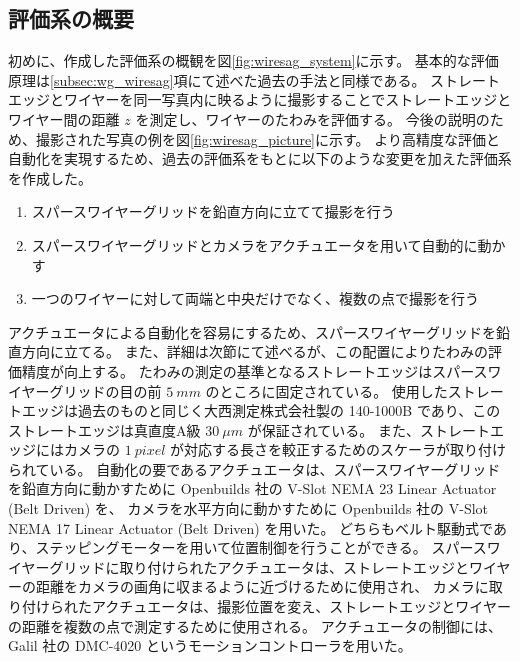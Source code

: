 \documentclass[../../main.tex]{subfiles}
\begin{document}
\subsection{評価系の概要}
初めに、作成した評価系の概観を図\ref{fig:wiresag_system}に示す。
基本的な評価原理は\ref{subsec:wg_wiresag}項にて述べた過去の手法と同様である。
ストレートエッジとワイヤーを同一写真内に映るように撮影することでストレートエッジとワイヤー間の距離 $z$ を測定し、ワイヤーのたわみを評価する。
今後の説明のため、撮影された写真の例を図\ref{fig:wiresag_picture}に示す。
より高精度な評価と自動化を実現するため、過去の評価系をもとに以下のような変更を加えた評価系を作成した。
\begin{enumerate}
    \item スパースワイヤーグリッドを鉛直方向に立てて撮影を行う
    \item スパースワイヤーグリッドとカメラをアクチュエータを用いて自動的に動かす
    \item 一つのワイヤーに対して両端と中央だけでなく、複数の点で撮影を行う
\end{enumerate}

アクチュエータによる自動化を容易にするため、スパースワイヤーグリッドを鉛直方向に立てる。
また、詳細は次節にて述べるが、この配置によりたわみの評価精度が向上する。
たわみの測定の基準となるストレートエッジはスパースワイヤーグリッドの目の前 $\SI{5}{mm}$ のところに固定されている。
使用したストレートエッジは過去のものと同じく大西測定株式会社製の 140-1000B であり、このストレートエッジは真直度A級 $\SI{30}{\mu m}$ が保証されている。
また、ストレートエッジにはカメラの $\SI{1}{pixel}$ が対応する長さを較正するためのスケーラが取り付けられている。
自動化の要であるアクチュエータは、スパースワイヤーグリッドを鉛直方向に動かすために Openbuilds 社の V-Slot NEMA 23 Linear Actuator (Belt Driven) を、
カメラを水平方向に動かすために Openbuilds 社の V-Slot NEMA 17 Linear Actuator (Belt Driven) を用いた。
どちらもベルト駆動式であり、ステッピングモーターを用いて位置制御を行うことができる。
スパースワイヤーグリッドに取り付けられたアクチュエータは、ストレートエッジとワイヤーの距離をカメラの画角に収まるように近づけるために使用され、
カメラに取り付けられたアクチュエータは、撮影位置を変え、ストレートエッジとワイヤーの距離を複数の点で測定するために使用される。
アクチュエータの制御には、Galil 社の DMC-4020 というモーションコントローラを用いた。
\end{document}
